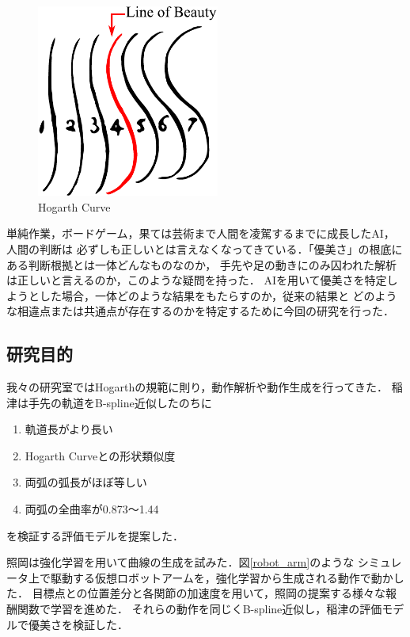 \begin{figure}[t]
  \begin{center}
    \includegraphics[width=60mm]{images/hogarth_curve.pdf}
  \end{center}
  \caption{Hogarth Curve}
  \label{hogarth_curve}
\end{figure}

単純作業，ボードゲーム，果ては芸術まで人間を凌駕するまでに成長したAI，人間の判断は
必ずしも正しいとは言えなくなってきている．「優美さ」の根底にある判断根拠とは一体どんなものなのか，
手先や足の動きにのみ囚われた解析は正しいと言えるのか，このような疑問を持った．
AIを用いて優美さを特定しようとした場合，一体どのような結果をもたらすのか，従来の結果と
どのような相違点または共通点が存在するのかを特定するために今回の研究を行った．
\clearpage

\subsection{研究目的}
我々の研究室ではHogarthの規範に則り，動作解析や動作生成を行ってきた．
稲津\cite{inadu}は手先の軌道をB-spline近似\cite{bspline}したのちに
\begin{enumerate}
  \item 軌道長がより長い
  \item Hogarth Curveとの形状類似度
  \item 両弧の弧長がほぼ等しい
  \item 両弧の全曲率が0.873〜1.44
\end{enumerate}
を検証する評価モデルを提案した．

照岡\cite{teruoka}は強化学習を用いて曲線の生成を試みた．図\ref{robot_arm}のような
シミュレータ上で駆動する仮想ロボットアームを，強化学習から生成される動作で動かした．
目標点との位置差分と各関節の加速度を用いて，照岡の提案する様々な報酬関数で学習を進めた．
それらの動作を同じくB-spline近似し，稲津の評価モデルで優美さを検証した．

